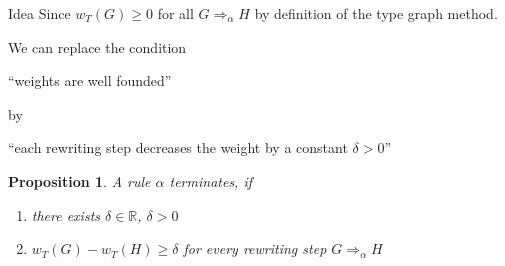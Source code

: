 \documentclass{beamer}
\newtheorem{proposition}{Proposition}
\begin{document}
\begin{frame}{Idea}
  Since $w_T(G) \geq 0$ for all $G \Rightarrow_\alpha H$ by definition of the type graph method.

  We can replace the condition
  \begin{center}
      \enquote{weights are well founded}  
  \end{center}
      by 
  \begin{center}
      \enquote{each rewriting step decreases the weight by a constant $\delta > 0$}
  \end{center}

  \begin{proposition}
  A rule $\alpha$ terminates, if 

   \begin{enumerate}
      \item there exists $\delta \in \mathbb{R}$, $\delta > 0$
      \item $w_T(G) - w_T(H) \geq \delta$ for every rewriting step $G \Rightarrow_\alpha H$
   \end{enumerate} 
  \end{proposition}

\end{frame}
\end{document}
